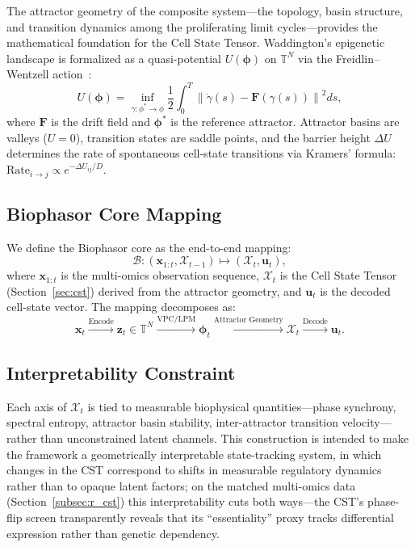 \documentclass[preprint,12pt,amsmath,amssymb,superscriptaddress,floatfix]{revtex4-2}
\newcommand{\torus}{\mathbb{T}}
\begin{document}
The attractor geometry of the composite system---the topology, basin
structure, and transition dynamics among the proliferating limit
cycles---provides the mathematical foundation for the Cell State Tensor.
Waddington's epigenetic landscape is formalized as a quasi-potential
$U(\boldsymbol{\phi})$ on $\torus^N$ via the Freidlin--Wentzell
action~\cite{ref_freidlin1998}:
\begin{equation}
    U(\boldsymbol{\phi}) = \inf_{\gamma: \phi^* \to \phi}
    \frac{1}{2}\int_0^T \left\|\dot{\gamma}(s)
    - \mathbf{F}(\gamma(s))\right\|^2 ds,
    \label{eq:quasi_potential}
\end{equation}
where $\mathbf{F}$ is the drift field and $\boldsymbol{\phi}^*$ is the
reference attractor.  Attractor basins are valleys ($U = 0$), transition
states are saddle points, and the barrier height $\Delta U$ determines
the rate of spontaneous cell-state transitions via Kramers'
formula: $\text{Rate}_{i \to j} \propto e^{-\Delta U_{ij}/D}$.

\subsection{Biophasor Core Mapping}

We define the Biophasor core as the end-to-end mapping:
\begin{equation}
    \mathcal{B}: (\mathbf{x}_{1:t}, \mathcal{X}_{t-1})
    \mapsto (\mathcal{X}_t, \mathbf{u}_t),
    \label{eq:biophasor_core}
\end{equation}
where $\mathbf{x}_{1:t}$ is the multi-omics observation sequence,
$\mathcal{X}_t$ is the Cell State Tensor (Section~\ref{sec:cst})
derived from the attractor geometry, and $\mathbf{u}_t$ is the decoded
cell-state vector.  The mapping decomposes as:
\begin{equation}
    \mathbf{x}_t \xrightarrow{\text{Encode}}
    \boldsymbol{z}_t \in \torus^N \xrightarrow{\text{VPC/LPM}}
    \boldsymbol{\phi}_t \xrightarrow{\text{Attractor Geometry}}
    \mathcal{X}_t \xrightarrow{\text{Decode}} \mathbf{u}_t.
\end{equation}

\subsection{Interpretability Constraint}

Each axis of $\mathcal{X}_t$ is tied to measurable biophysical
quantities---phase synchrony, spectral entropy, attractor basin stability,
inter-attractor transition velocity---rather than unconstrained latent
channels.  This construction is intended to make the framework a
geometrically interpretable state-tracking system, in which changes in the
CST correspond to shifts in measurable regulatory dynamics rather than to
opaque latent factors; on the matched multi-omics data
(Section~\ref{subsec:r_cst}) this interpretability cuts both ways---the CST's
phase-flip screen transparently reveals that its ``essentiality'' proxy tracks
differential expression rather than genetic dependency.
\end{document}
